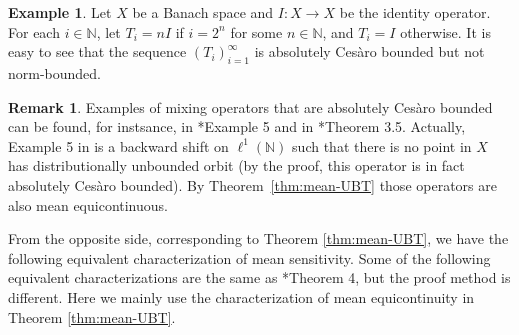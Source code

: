 \documentclass[12pt,a4paper]{amsart}
\theoremstyle{definition}
\newtheorem{exam}[defn]{Example}
\newtheorem{rem}[defn]{Remark}
\theoremstyle{plain}
\begin{document}
\begin{exam}
    Let $X$ be a Banach space and $I\colon X\to X$ be the identity operator.
    For each $i\in\mathbb{N}$, let $T_i=nI$ if $i=2^n$ for some $n\in\mathbb{N}$, and $T_i=I$ otherwise.
    It is easy to see that the sequence $(T_i)_{i=1}^\infty$ is absolutely Ces\`aro bounded but not norm-bounded.
\end{exam}

\begin{rem}
Examples of mixing operators that are absolutely Ces\`aro bounded can be found, for instsance, in \cite{BBMP2013}*{Example 5} and in  \cite{LH2015}*{Theorem 3.5}. Actually, Example 5 in \cite{BBMP2013} is a backward shift on $\ell^1(\mathbb{N})$ such that there is no point in $X$ has distributionally unbounded orbit (by the proof, this operator is in fact absolutely Ces\`aro bounded). By Theorem~\ref{thm:mean-UBT} those operators are also mean equicontinuous.
\end{rem}



From the opposite side, corresponding to Theorem \ref{thm:mean-UBT}, we have the following equivalent characterization of mean sensitivity. Some of the following equivalent characterizations are the same as \cite{BBP2020}*{Theorem 4}, but the proof method is different. Here we mainly use the characterization of mean equicontinuity in Theorem \ref{thm:mean-UBT}.
\end{document}

